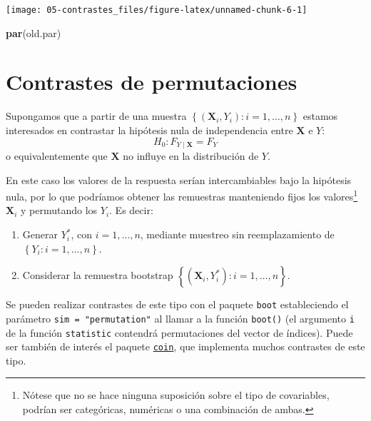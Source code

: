 \documentclass[
]{book}
\newenvironment{Shaded}{\begin{snugshade}}{\end{snugshade}}
\newcommand{\KeywordTok}[1]{\textcolor[rgb]{0.13,0.29,0.53}{\textbf{#1}}}
\newcommand{\NormalTok}[1]{#1}
\theoremstyle{break}
\theoremstyle{definition}
\theoremstyle{definition}
\theoremstyle{definition}
\theoremstyle{remark}
\begin{document}
\begin{center}\texttt{[image: 05-contrastes\_files/figure-latex/unnamed-chunk-6-1]} \end{center}

\begin{Shaded}
\begin{Highlighting}[]
\KeywordTok{par}\NormalTok{(old.par)}
\end{Highlighting}
\end{Shaded}

\hypertarget{contrastes-de-permutaciones}{%
\section{Contrastes de permutaciones}\label{contrastes-de-permutaciones}}

Supongamos que a partir de una muestra
\(\left\{ \left( \mathbf{X}_i, Y_i\right): i=1,\ldots, n \right\}\)
estamos interesados en contrastar la hipótesis nula de independencia
entre \(\mathbf{X}\) e \(Y\):
\[H_0: F_{Y \mid \mathbf{X}} = F_Y\]
o equivalentemente que \(\mathbf{X}\) no influye en la distribución de \(Y\).

En este caso los valores de la respuesta serían intercambiables bajo la hipótesis nula,
por lo que podríamos obtener las remuestras manteniendo fijos los valores\footnote{Nótese que
  no se hace ninguna suposición sobre el tipo de covariables,
  podrían ser categóricas, numéricas o una combinación de ambas.}
\(\mathbf{X}_i\) y permutando los \(Y_i\). Es decir:

\begin{enumerate}
\def\labelenumi{\arabic{enumi}.}
\item
  Generar \(Y^{\ast}_i\), con \(i=1,\ldots, n\), mediante muestreo
  sin reemplazamiento de \(\left\{ Y_i: i=1,\ldots, n \right\}\).
\item
  Considerar la remuestra bootstrap
  \(\left\{ \left( \mathbf{X}_i, Y^{\ast}_i\right): i=1,\ldots, n \right\}\).
\end{enumerate}

Se pueden realizar contrastes de este tipo con el paquete \texttt{boot} estableciendo
el parámetro \texttt{sim\ =\ "permutation"} al llamar a la función \texttt{boot()} (el argumento
\texttt{i} de la función \texttt{statistic} contendrá permutaciones del vector de índices).
Puede ser también de interés el paquete \href{https://cran.r-project.org/web/packages/coin/index.html}{\texttt{coin}},
que implementa muchos contrastes de este tipo.
\end{document}
